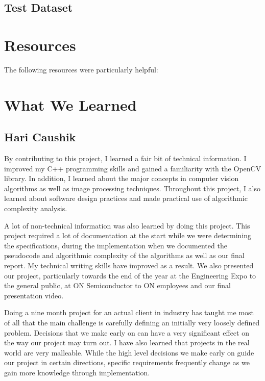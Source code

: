 \documentclass[letterpaper,10pt,titlepage]{article}
\begin{document}
\subsection*{Test Dataset}

\section*{Resources}
The following resources were particularly helpful:

\section*{What We Learned}
\subsection*{Hari Caushik}
By contributing to this project, I learned a fair bit of technical information. 
I improved my C++ programming skills and gained a familiarity with the OpenCV
library. In addition, I learned about the major concepts in computer vision
algorithms as well as image processing techniques. Throughout this project, I
also learned about software design practices and made practical use of
algorithmic complexity analysis.

A lot of non-technical information was also learned by doing this project. This
project required a lot of documentation at the start while we were 
determining the specifications, during the implementation when we documented 
the pseudocode and algorithmic complexity of the algorithms as well as our 
final report. My technical writing skills have improved as a result. We also 
presented our project, particularly towards the end of the year at the 
Engineering Expo to the general public, at ON Semiconductor to ON employees and
our final presentation video. 

Doing a nine month project for an actual client in industry has taught me most
of all that the main challenge is carefully defining an initially very 
loosely defined problem. Decisions that we make early on can have a very 
significant effect on the way our project may turn out. I have also learned 
that projects in the real world are very malleable. While the high level 
decisions we make early on guide our project in certain directions, specific 
requirements frequently change as we gain more knowledge through 
implementation. 
\end{document}

